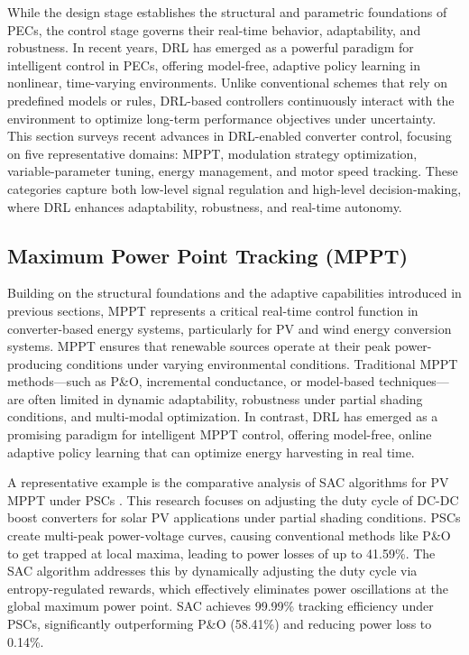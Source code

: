 While the design stage establishes the structural and parametric foundations of PECs, the control stage governs their real-time behavior, adaptability, and robustness. In recent years, DRL has emerged as a powerful paradigm for intelligent control in PECs, offering model-free, adaptive policy learning in nonlinear, time-varying environments. Unlike conventional schemes that rely on predefined models or rules, DRL-based controllers continuously interact with the environment to optimize long-term performance objectives under uncertainty. This section surveys recent advances in DRL-enabled converter control, focusing on five representative domains: MPPT, modulation strategy optimization, variable-parameter tuning, energy management, and motor speed tracking. These categories capture both low-level signal regulation and high-level decision-making, where DRL enhances adaptability, robustness, and real-time autonomy.

\subsection{Maximum Power Point Tracking (MPPT)}
\label{sec:ctrl_mppt}

Building on the structural foundations and the adaptive capabilities introduced in previous sections, MPPT represents a critical real-time control function in converter-based energy systems, particularly for PV and wind energy conversion systems. MPPT ensures that renewable sources operate at their peak power-producing conditions under varying environmental conditions. Traditional MPPT methods—such as P\&O, incremental conductance, or model-based techniques—are often limited in dynamic adaptability, robustness under partial shading conditions, and multi-modal optimization. In contrast, DRL has emerged as a promising paradigm for intelligent MPPT control, offering model-free, online adaptive policy learning that can optimize energy harvesting in real time.

A representative example is the comparative analysis of SAC algorithms for PV MPPT under PSCs \cite{nwachukwu2025comparative}. This research focuses on adjusting the duty cycle of DC-DC boost converters for solar PV applications under partial shading conditions. PSCs create multi-peak power-voltage curves, causing conventional methods like P\&O to get trapped at local maxima, leading to power losses of up to 41.59\%. The SAC algorithm addresses this by dynamically adjusting the duty cycle via entropy-regulated rewards, which effectively eliminates power oscillations at the global maximum power point. SAC achieves 99.99\% tracking efficiency under PSCs, significantly outperforming  P\&O (58.41\%) and reducing power loss to 0.14\%.

